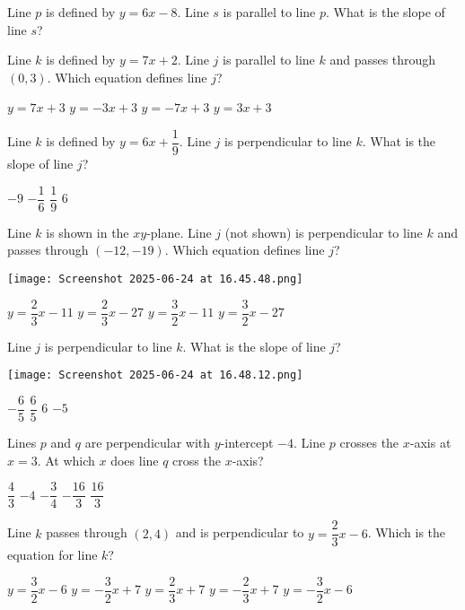 \documentclass[12pt]{exam}
\begin{document}
\begin{questions}
\question Line $p$ is defined by $y = 6x - 8$. Line $s$ is parallel to line $p$. What is the slope of line $s$?

\question Line $k$ is defined by $y = 7x + 2$. Line $j$ is parallel to line $k$ and passes through $(0,3)$. Which equation defines line $j$?
\begin{choices}
\choice $y = 7x + 3$
\choice $y = -3x + 3$
\choice $y = -7x + 3$
\choice $y = 3x + 3$
\end{choices}

\question Line $k$ is defined by $y = 6x + \dfrac{1}{9}$. Line $j$ is perpendicular to line $k$. What is the slope of line $j$?
\begin{choices}
\choice $-9$
\choice $-\dfrac{1}{6}$
\choice $\dfrac{1}{9}$
\choice $6$
\end{choices}

\question Line $k$ is shown in the $xy$-plane. Line $j$ (not shown) is perpendicular to line $k$ and passes through $(-12,-19)$. Which equation defines line $j$?
\begin{center}
\texttt{[image: Screenshot 2025-06-24 at 16.45.48.png]}
\end{center}
\begin{choices}
\choice $y = \dfrac{2}{3}x - 11$
\choice $y = \dfrac{2}{3}x - 27$
\choice $y = \dfrac{3}{2}x - 11$
\choice $y = \dfrac{3}{2}x - 27$
\end{choices}

\question Line $j$ is perpendicular to line $k$. What is the slope of line $j$?
\begin{center}
\texttt{[image: Screenshot 2025-06-24 at 16.48.12.png]}
\end{center}
\begin{choices}
\choice $-\dfrac{6}{5}$
\choice $\dfrac{6}{5}$
\choice $6$
\choice $-5$
\end{choices}

\question Lines $p$ and $q$ are perpendicular with $y$-intercept $-4$. Line $p$ crosses the $x$-axis at $x=3$. At which $x$ does line $q$ cross the $x$-axis?
\begin{choices}
\choice $\dfrac{4}{3}$
\choice $-4$
\choice $-\dfrac{3}{4}$
\choice $-\dfrac{16}{3}$
\choice $\dfrac{16}{3}$
\end{choices}

\question Line $k$ passes through $(2,4)$ and is perpendicular to $y = \dfrac{2}{3}x - 6$. Which is the equation for line $k$?
\begin{choices}
\choice $y = \dfrac{3}{2}x - 6$
\choice $y = -\dfrac{3}{2}x + 7$
\choice $y = \dfrac{2}{3}x + 7$
\choice $y = -\dfrac{2}{3}x + 7$
\choice $y = -\dfrac{3}{2}x - 6$
\end{choices}


\end{questions}
\end{document}
